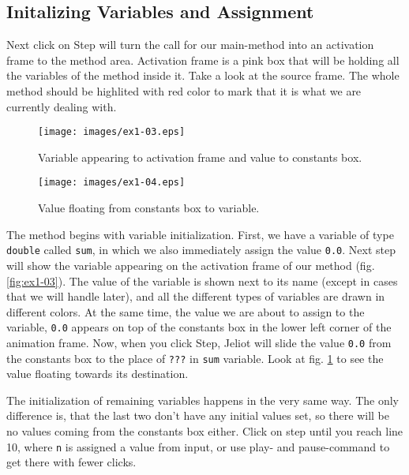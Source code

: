 \documentclass[a4paper,12pt,english]{article}
\newcommand{\jel}{Jeliot}
\newcommand{\p}[1]{\texttt{#1}}
\newcommand{\bu}[1]{\textsf{#1}}
\begin{document}
\subsection{Initalizing Variables and Assignment}

Next click on \bu{Step} will turn the call for our main-method into an activation frame to the method area. Activation frame is a pink box that will be holding all the variables of the method inside it. Take a look at the source frame. The whole method should be highlited with red color to mark that it is what we are currently dealing with.

\begin{figure}[ht]
  \begin{minipage}[t]{.49\textwidth}
    \begin{center}  
      \texttt{[image: images/ex1-03.eps]}
      \caption{\label{fig:ex1-03}Variable appearing to activation frame and value to constants box.}
    \end{center}
  \end{minipage}
  \hfill
  \begin{minipage}[t]{.49\textwidth}
    \begin{center}  
      \texttt{[image: images/ex1-04.eps]}
      \caption{\label{fig:ex1-04}Value floating from constants box to variable.}
    \end{center}
  \end{minipage}
\end{figure}

The method begins with variable initialization. First, we have a variable of type \p{double} called \p{sum}, in which we also immediately assign the value \p{0.0}. Next step will show the variable appearing on the activation frame of our method (fig. \ref{fig:ex1-03}). The value of the variable is shown next to its name (except in cases that we will handle later), and all the different types of variables are drawn in different colors. At the same time, the value we are about to assign to the variable, \p{0.0} appears on top of the constants box in the lower left corner of the animation frame. Now, when you click \bu{Step}, \jel{} will slide the value \p{0.0} from the constants box to the place of \p{?\Large{?}\small{?}} in \p{sum} variable. Look at fig. \ref{fig:ex1-04} to see the value floating towards its destination.

The initialization of remaining variables happens in the very same way. The only difference is, that the last two don't have any initial values set, so there will be no values coming from the constants box either. Click on \bu{step} until you reach line 10, where \p{n} is assigned a value from input, or use play- and pause-command to get there with fewer clicks.
\end{document}
